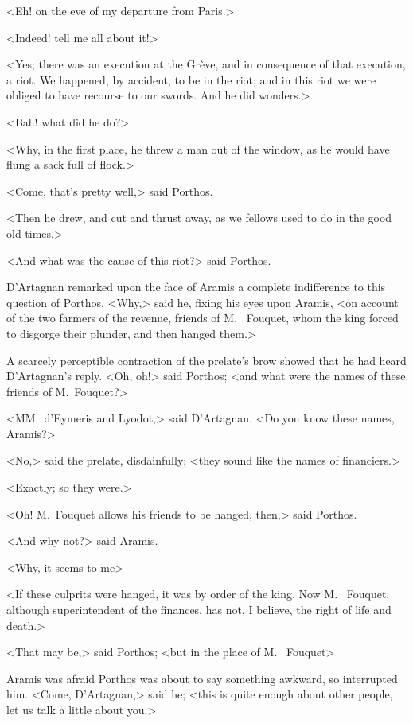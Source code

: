 <Eh!  on the eve of my departure from Paris.>

<Indeed! tell me all about it!>

<Yes; there was an execution at the Grève, and in consequence of that execution, a riot. We happened, by accident, to be in the riot; and in this riot we were obliged to have recourse to our swords. And he did wonders.>

<Bah! what did he do?>

<Why, in the first place, he threw a man out of the window, as he would have flung a sack full of flock.>

<Come, that's pretty well,> said Porthos.

<Then he drew, and cut and thrust away, as we fellows used to do in the good old times.>

<And what was the cause of this riot?> said Porthos.

D'Artagnan remarked upon the face of Aramis a complete indifference to this question of Porthos. <Why,> said he, fixing his eyes upon Aramis, <on account of the two farmers of the revenue, friends of M.~ Fouquet, whom the king forced to disgorge their plunder, and then hanged them.>

A scarcely perceptible contraction of the prelate's brow showed that he had heard D'Artagnan's reply. <Oh, oh!> said Porthos; <and what were the names of these friends of M.~Fouquet?>

<MM.~d'Eymeris and Lyodot,> said D'Artagnan. <Do you know these names, Aramis?>

<No,> said the prelate, disdainfully; <they sound like the names of financiers.>

<Exactly; so they were.>

<Oh! M.~Fouquet allows his friends to be hanged, then,> said Porthos.

<And why not?> said Aramis.

<Why, it seems to me\longdash>

<If these culprits were hanged, it was by order of the king. Now M.~ Fouquet, although superintendent of the finances, has not, I believe, the right of life and death.>

<That may be,> said Porthos; <but in the place of M.~ Fouquet\longdash>

Aramis was afraid Porthos was about to say something awkward, so interrupted him. <Come, D'Artagnan,> said he; <this is quite enough about other people, let us talk a little about you.>

